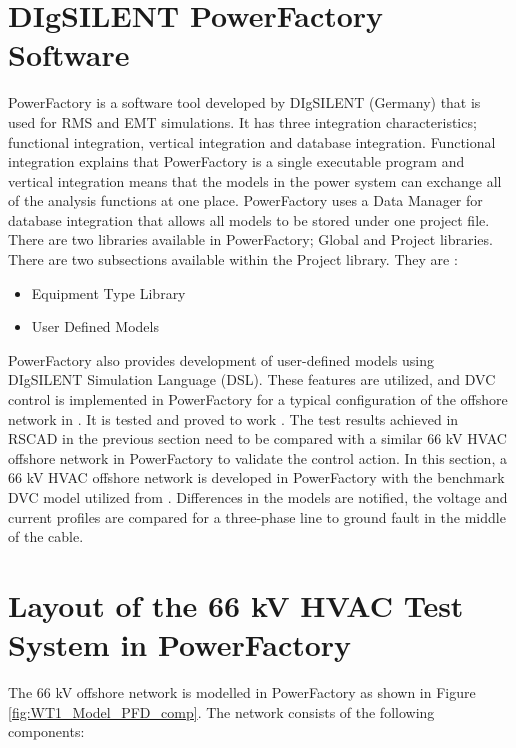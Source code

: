 \section{DIgSILENT PowerFactory Software}
PowerFactory is a software tool developed by DIgSILENT (Germany) that is used for RMS and EMT simulations. It has three integration characteristics; functional integration, vertical integration and database integration. Functional integration explains that PowerFactory is a single executable program and vertical integration means that the models in the power system can exchange all of the analysis functions at one place. PowerFactory uses a Data Manager for database integration that allows all models to be stored under one project file. There are two libraries available in PowerFactory; Global and Project libraries. There are two subsections available within the Project library. They are \cite{powerfactory_tech}:
\begin{itemize}
    \item Equipment Type Library
    \item User Defined Models
\end{itemize}
PowerFactory also provides development of user-defined models using DIgSILENT Simulation Language (DSL). These features are utilized, and \gls{DVC} control is implemented in PowerFactory for a typical configuration of the offshore network in \cite{korai_dynamic_2019}. It is tested and proved to work \cite{korai_dynamic_2019}. The test results achieved in RSCAD in the previous section need to be compared with a similar 66 kV \gls{HVAC} offshore network in PowerFactory to validate the control action. In this section, a 66 kV \gls{HVAC} offshore network is developed in PowerFactory with the benchmark \gls{DVC} model utilized from \cite{korai_dynamic_2019}. Differences in the models are notified, the voltage and current profiles are compared for a three-phase line to ground fault in the middle of the cable.

\section{Layout of the 66 kV HVAC Test System in PowerFactory}

The 66 kV offshore network is modelled in PowerFactory as shown in Figure \ref{fig:WT1_Model_PFD_comp}. The network consists of the following components:

